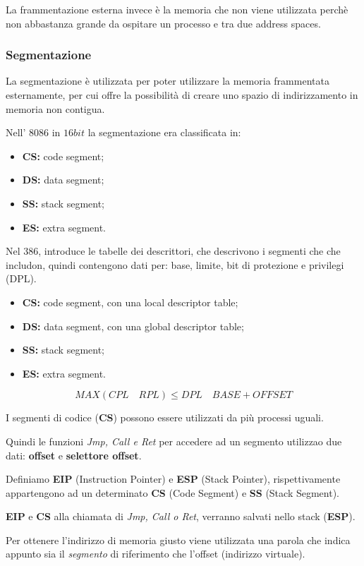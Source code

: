 La frammentazione esterna invece è la memoria che non viene utilizzata perchè
non abbastanza grande da ospitare un processo e tra due address spaces.

\subsubsection{Segmentazione}
La segmentazione è utilizzata per poter utilizzare la memoria frammentata
esternamente, per cui offre la possibilità di creare uno spazio di
indirizzamento in memoria non contigua.


Nell' $8086$ in $16bit$ la segmentazione era classificata in:
\begin{itemize}
  \item \textbf{CS:} code segment;
  \item \textbf{DS:} data segment;
  \item \textbf{SS:} stack segment;
  \item \textbf{ES:} extra segment.
\end{itemize}

Nel $386$, introduce le tabelle dei descrittori, che descrivono i segmenti che
che includon, quindi contengono dati per: base, limite, bit di protezione e
privilegi (DPL).

\begin{itemize}
  \item \textbf{CS:} code segment, con una local descriptor table;
  \item \textbf{DS:} data segment, con una global descriptor table;
  \item \textbf{SS:} stack segment;
  \item \textbf{ES:} extra segment.
\end{itemize}
\[
  MAX(CPL \quad RPL) \leq DPL \quad BASE + OFFSET
\]

I segmenti di codice (\textbf{CS}) possono essere utilizzati da più processi
uguali.

Quindi le funzioni \textit{Jmp, Call e Ret} per accedere ad un segmento
utilizzao due dati: \textbf{offset} e \textbf{selettore offset}.

Definiamo \textbf{EIP} (Instruction Pointer) e \textbf{ESP} (Stack Pointer),
rispettivamente appartengono ad un determinato \textbf{CS} (Code Segment) e
\textbf{SS} (Stack Segment).

\textbf{EIP} e \textbf{CS} alla chiamata di \textit{Jmp, Call o Ret}, verranno
salvati nello stack (\textbf{ESP}).


Per ottenere l'indirizzo di memoria giusto viene utilizzata una parola che
indica appunto sia il \emph{segmento} di riferimento che l'offset (indirizzo
virtuale).


